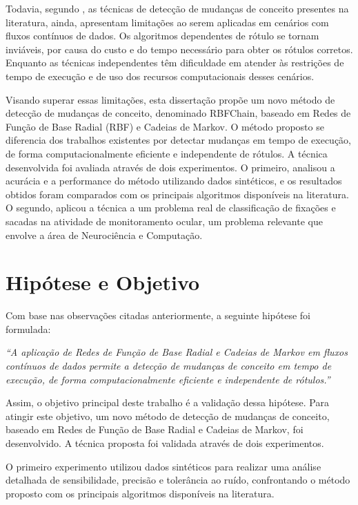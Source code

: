 \documentclass[msc, classic, a4paper]{ufbathesis}
\begin{document}
Todavia, segundo ,
as técnicas de detecção de mudanças de conceito presentes na literatura, ainda, apresentam limitações ao serem aplicadas em cenários com fluxos contínuos de dados.
%
Os algoritmos dependentes de rótulo se tornam inviáveis, por causa do custo e do tempo necessário para obter os rótulos corretos.
%
Enquanto as técnicas independentes têm dificuldade em atender às restrições de tempo de execução e de uso dos recursos computacionais desses cenários.

Visando superar essas limitações, esta dissertação propõe um novo método de detecção de mudanças de conceito, denominado RBFChain, baseado em Redes de Função de Base Radial (RBF) e Cadeias de Markov.
O método proposto se diferencia dos trabalhos existentes por detectar mudanças em tempo de execução, de forma computacionalmente eficiente e independente de rótulos.
A técnica desenvolvida foi avaliada através de dois experimentos.
O primeiro, analisou a acurácia e a performance do método utilizando dados sintéticos, e os resultados obtidos foram comparados com os principais algoritmos disponíveis na literatura.
O segundo, aplicou a técnica a um problema real de classificação de fixações e sacadas na atividade de monitoramento ocular, um problema relevante que envolve a área de Neurociência e Computação.

\section{Hipótese e Objetivo}

Com base nas observações citadas anteriormente, a seguinte hipótese foi formulada:

\begin{center}
\textit{``A aplicação de Redes de Função de Base Radial e Cadeias de Markov em fluxos contínuos de dados permite a detecção de mudanças de conceito em tempo de execução, de forma computacionalmente eficiente e independente de rótulos.''}
\end{center}

Assim, o objetivo principal deste trabalho é a validação dessa hipótese.
Para atingir este objetivo, um novo método de detecção de mudanças de conceito, baseado em Redes de Função de Base Radial e Cadeias de Markov, foi desenvolvido.
A técnica proposta foi validada através de dois experimentos.

O primeiro experimento utilizou dados sintéticos para realizar uma análise detalhada de sensibilidade, precisão e tolerância ao ruído, confrontando o método proposto com os principais algoritmos disponíveis na literatura.
\end{document}
